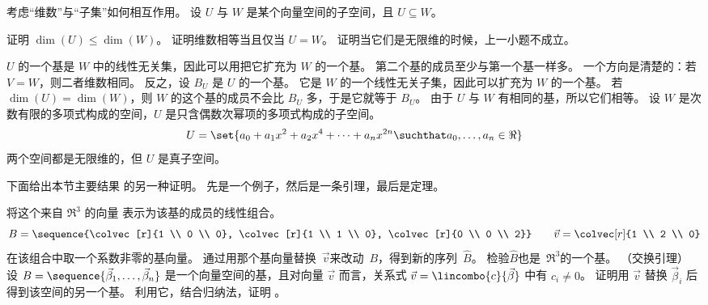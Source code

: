   \recommended \item 
     考虑“维数”与“子集”如何相互作用。
     设 \( U \) 与 \( W \) 是某个向量空间的子空间，且 \( U\subseteq W \)。
    \begin{exparts}
      \partsitem 证明 \( \dim (U)\leq\dim (W) \)。
      \partsitem 证明维数相等当且仅当 \( U=W \)。
      \partsitem 证明当它们是无限维的时候，上一小题不成立。
    \end{exparts}
    \begin{answer}
       \begin{exparts}
          \partsitem \( U \) 的一个基是 \( W \) 中的线性无关集，因此可以用把它扩充为 \( W \) 的一个基。
            第二个基的成员至少与第一个基一样多。
          \partsitem 一个方向是清楚的：若 \( V=W \)，则二者维数相同。
            反之，设 \( B_U \) 是 \( U \) 的一个基。
            它是 \( W \) 的一个线性无关子集，因此可以扩充为 \( W \) 的一个基。
            若 \( \dim(U)=\dim(W) \)，则 \( W \) 的这个基的成员不会比 \( B_U \) 多，于是它就等于 \( B_U \)。
            由于 \( U \) 与 \( W \) 有相同的基，所以它们相等。
          \partsitem 设 \( W \) 是次数有限的多项式构成的空间，\( U \) 是只含偶数次幂项的多项式构成的子空间。
             \begin{equation*}
                U=\set{a_0+a_1x^2+a_2x^4+\dots+a_nx^{2n}\suchthat
                           a_0,\ldots,a_n\in\Re} 
             \end{equation*}
            两个空间都是无限维的，但 \( U \) 是真子空间。
        \end{exparts}  
      \end{answer}
    \item 下面给出本节主要结果
      的另一种证明。
      先是一个例子，然后是一条引理，最后是定理。
      \begin{exparts}
        \partsitem 将这个来自 $\Re^3$ 的向量
          表示为该基的成员的线性组合。
         \begin{equation*}
           B=\sequence{\colvec[r]{1 \\ 0  \\ 0},
             \colvec[r]{1 \\ 1 \\ 0},
             \colvec[r]{0 \\ 0 \\ 2}}
           \qquad
           \vec{v}=\colvec[r]{1 \\ 2 \\ 0}
         \end{equation*}
        \partsitem 在该组合中取一个系数非零的基向量。
          通过用那个基向量替换~$\vec{v}$来改动~$B$，得到新的序列~$\hat{B}$。
          检验$\hat{B}$也是~$\Re^3$的一个基。
        \partsitem （交换引理）
          设
          \( B=\sequence{\vec{\beta}_1,\dots,\vec{\beta}_n} \) 是一个向量空间的基，且对向量 \( \vec{v} \)
          而言，关系式 \( \vec{v}=\lincombo{c}{\vec{\beta}} \)
          中有 \( c_i\neq 0 \)。
          证明用 \( \vec{v} \) 替换 \( \vec{\beta}_i \)
          后得到该空间的另一个基。
        \partsitem 利用它，结合归纳法，证明
          。
      \end{exparts}
